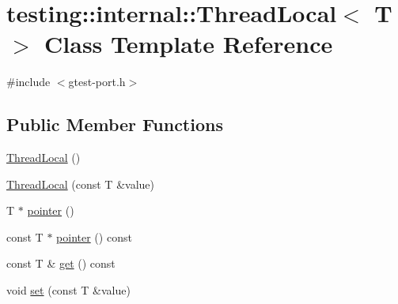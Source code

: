 \hypertarget{classtesting_1_1internal_1_1_thread_local}{\section{testing\+:\+:internal\+:\+:Thread\+Local$<$ T $>$ Class Template Reference}
\label{classtesting_1_1internal_1_1_thread_local}
}


{\ttfamily \#include $<$gtest-\/port.\+h$>$}

\subsection*{Public Member Functions}
\begin{DoxyCompactItemize}
\item 
\hyperlink{classtesting_1_1internal_1_1_thread_local_a106f3a3ad15d08f95f9887105d2a1af5}{Thread\+Local} ()
\item 
\hyperlink{classtesting_1_1internal_1_1_thread_local_a85610bdfdbc93a4c56215e0aad7da870}{Thread\+Local} (const T \&value)
\item 
T $\ast$ \hyperlink{classtesting_1_1internal_1_1_thread_local_a882f57fed4b074de83693c0c0fe62858}{pointer} ()
\item 
const T $\ast$ \hyperlink{classtesting_1_1internal_1_1_thread_local_af4b33c12fd2da7d43d8654feccca77f7}{pointer} () const 
\item 
const T \& \hyperlink{classtesting_1_1internal_1_1_thread_local_a9cfa47ae6e9e8c19fe8782e2e9c1b13e}{get} () const 
\item 
void \hyperlink{classtesting_1_1internal_1_1_thread_local_ab5ebc7ba07426cef7167afa2a7707eb4}{set} (const T \&value)
\end{DoxyCompactItemize}


